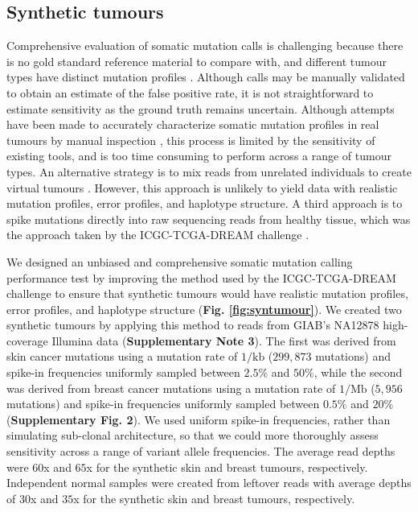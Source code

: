 \documentclass[notitlepage, twocolumn, 10pt]{article}
\begin{document}
\subsection*{Synthetic tumours}
Comprehensive evaluation of somatic mutation calls is challenging because there is no gold standard reference material to compare with, and different tumour types have distinct mutation profiles \cite{RN86}. Although calls may be manually validated to obtain an estimate of the false positive rate, it is not straightforward to estimate sensitivity as the ground truth remains uncertain. Although attempts have been made to accurately characterize somatic mutation profiles in real tumours by manual inspection \cite{RN155}, this process is limited by the sensitivity of existing tools, and is too time consuming to perform across a range of tumour types. An alternative strategy is to mix reads from unrelated individuals to create virtual tumours \cite{RN142, RN604}. However, this approach is unlikely to yield data with realistic mutation profiles, error profiles, and haplotype structure. A third approach is to spike mutations directly into raw sequencing reads from healthy tissue, which was the approach taken by the ICGC-TCGA-DREAM challenge \cite{RN147}.

We designed an unbiased and comprehensive somatic mutation calling performance test by improving the method used by the ICGC-TCGA-DREAM challenge to ensure that synthetic tumours would have realistic mutation profiles, error profiles, and haplotype structure (\textbf{Fig. \ref{fig:syntumour}}). We created two synthetic tumours by applying this method to reads from GIAB's NA12878 high-coverage Illumina data (\textbf{Supplementary Note 3}). The first was derived from skin cancer mutations using a mutation rate of $1/\text{kb}$ ($299,873$ mutations) and spike-in frequencies uniformly sampled between $2.5\%$ and $50\%$, while the second was derived from breast cancer mutations using a mutation rate of $1/\text{Mb}$ ($5,956$ mutations) and spike-in frequencies uniformly sampled between $0.5\%$ and $20\%$ (\textbf{Supplementary Fig. 2}). We used uniform spike-in frequencies, rather than simulating sub-clonal architecture, so that we could more thoroughly assess sensitivity across a range of variant allele frequencies. The average read depths were $60$x and $65$x for the synthetic skin and breast tumours, respectively. Independent normal samples were created from leftover reads with average depths of $30$x and $35$x for the synthetic skin and breast tumours, respectively.
\end{document}

